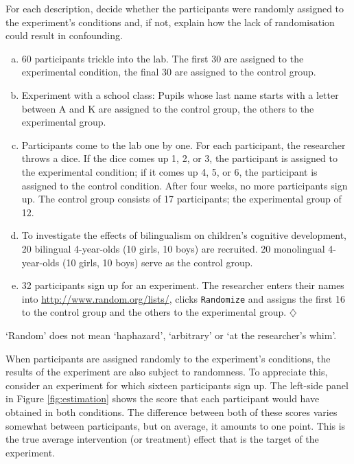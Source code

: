 \documentclass[a4paper]{tufte-book}\usepackage[]{graphicx}\usepackage[]{xcolor}
\newcommand*{\parend}[1][$\diamondsuit$]{%
\leavevmode\unskip\penalty9999 \hbox{}\nobreak\hfill
    \quad\hbox{#1}%
}
\begin{document}
For each description, decide whether the participants were randomly assigned
to the experiment's conditions and, if not, explain how the lack of randomisation
could result in confounding.

\begin{enumerate}[(a)]
 \item 60 participants trickle into the lab.
 The first 30 are assigned to the experimental condition,
 the final 30 are assigned to the control group.
 \item Experiment with a school class:
 Pupils whose last name starts with a letter between
 A and K are assigned to the control group,
 the others to the experimental group.
 \item Participants come to the lab one by one.
 For each participant, the researcher throws a dice.
 If the dice comes up 1, 2, or 3, the participant is
 assigned to the experimental condition; if it comes
 up 4, 5, or 6, the participant is assigned to the control
 condition.
 After four weeks, no more participants sign up.
 The control group consists of 17 participants;
 the experimental group of 12.
 \item To investigate the effects of bilingualism
 on children's cognitive development, 20 bilingual
 4-year-olds (10 girls, 10 boys) are recruited.
 20 monolingual 4-year-olds (10 girls, 10 boys)
 serve as the control group.
 \item 32 participants sign up for an experiment.
 The researcher enters their names into \url{http://www.random.org/lists/},
 clicks \texttt{Randomize} and assigns the first 16 to the control group
 and the others to the experimental group. \parend
\end{enumerate}

\begin{framed}
`Random' does not mean `haphazard', `arbitrary' or `at the researcher's whim'.
\end{framed}

\label{remark:estimation}
  When participants are assigned randomly to the experiment's conditions,
  the results of the experiment are also subject to randomness.
  To appreciate this, 
  consider an experiment for which sixteen participants sign up.
  The left-side panel in Figure \ref{fig:estimation} shows the score
  that each participant would have obtained in both conditions.
  The difference between both of these scores varies somewhat between
  participants, but on average, it amounts to one point.
  This is the true average intervention (or treatment) effect that is the target
  of the experiment.
  
\end{document}
